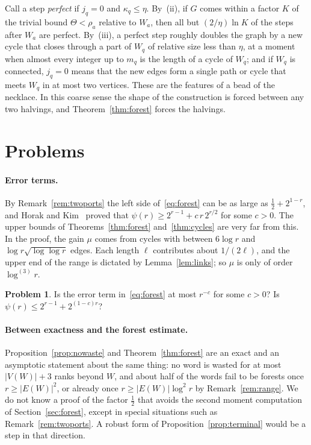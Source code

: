 \documentclass[11pt]{article}
\theoremstyle{definition}
\newtheorem{problem}[theorem]{Problem}
\theoremstyle{remark}
\newcommand{\lgk}[1]{\log^{(#1)}}
\newcommand{\half}{\tfrac12}
\begin{document}
Call a step \emph{perfect} if $j_q=0$ and $\kappa_q\le\eta$. By~(ii), if $G$ comes within a factor
$K$ of the trivial bound $\Theta<\rho_a$ relative to $W_a$, then all but $(2/\eta)\ln K$ of the
steps after $W_a$ are perfect. By~(iii), a perfect step roughly doubles the graph by a new cycle
that closes through a part of $W_q$ of relative size less than $\eta$, at a moment when almost every
integer up to $m_q$ is the length of a cycle of $W_q$; and if $W_q$ is connected, $j_q=0$ means that
the new edges form a single path or cycle that meets $W_q$ in at most two vertices. These are the
features of a bead of the necklace. In this coarse sense the shape of the construction is forced
between any two halvings, and Theorem~\ref{thm:forest} forces the halvings.

\section{Problems}\label{sec:problems}

\paragraph{Error terms.}
By Remark~\ref{rem:twoports} the left side of~\eqref{eq:forest} can be as large as
$\half+2^{1-r}$, and Horak and Kim~\cite{HK} proved that $\psi(r)\ge2^{r-1}+c\,r\,2^{r/2}$ for some
$c>0$. The upper bounds of Theorems~\ref{thm:forest} and~\ref{thm:cycles} are very far from this. In
the proof, the gain $\mu$ comes from cycles with between $6\log r$ and $\log r\sqrt{\log\log r}$
edges. Each length $\ell$ contributes about $1/(2\ell)$, and the upper end of the range is dictated
by Lemma~\ref{lem:links}; so $\mu$ is only of order $\lgk3r$.

\begin{problem}
Is the error term in~\eqref{eq:forest} at most $r^{-c}$ for some $c>0$? Is
$\psi(r)\le2^{r-1}+2^{(1-c)r}$?
\end{problem}

\paragraph{Between exactness and the forest estimate.}
Proposition~\ref{prop:nowaste} and Theorem~\ref{thm:forest} are an exact and an asymptotic statement
about the same thing: no word is wasted for at most $|V(W)|+3$ ranks beyond $W$, and about half
of the words fail to be forests once $r\ge|E(W)|^{2}$, or already once $r\ge|E(W)|\log^{2}r$ by
Remark~\ref{rem:range}. We do not know a proof of the factor $\half$ that
avoids the second moment computation of Section~\ref{sec:forest}, except in special situations such
as Remark~\ref{rem:twoports}. A robust form of Proposition~\ref{prop:terminal} would be a step in
that direction.
\end{document}
